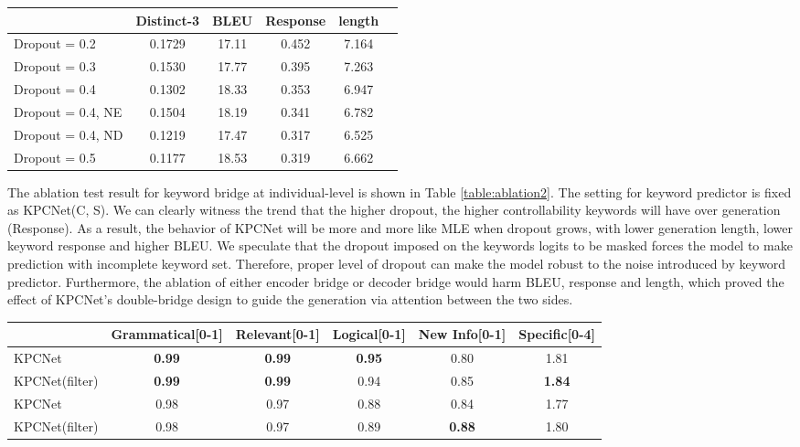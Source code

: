 \documentclass[letterpaper]{article} %
\begin{document}
\begin{table*}[htbp]
  \centering
  \begin{tabular}{l|ccccc}
  \hline
  {} & Distinct-3 & BLEU & Response & length \\
  \hline
  Dropout = 0.2 & 0.1729 & 17.11 & 0.452 & 7.164 \\ 
  Dropout = 0.3 & 0.1530 & 17.77 & 0.395 & 7.263 \\
  Dropout = 0.4 & 0.1302 & 18.33 & 0.353 & 6.947 \\
  Dropout = 0.4, NE & 0.1504 & 18.19 & 0.341 & 6.782 \\
  Dropout = 0.4, ND & 0.1219 & 17.47 & 0.317 & 6.525 \\
  Dropout = 0.5 & 0.1177 & 18.53 & 0.319 & 6.662 \\
  \hline
  \end{tabular}
  \caption{\label{table:ablation2} Ablation test results for keyword bridge at individual-level on \texttt{Home \& Kitchen}.}
  \end{table*}

  The ablation test result for keyword bridge at individual-level is shown in Table \ref{table:ablation2}. The setting for keyword predictor is fixed as KPCNet(C, S). We can clearly witness the trend that the higher dropout, the higher controllability keywords will have over generation (Response). As a result, the behavior of KPCNet will be more and more like MLE when dropout grows, with lower generation length, lower keyword response and higher BLEU. We speculate that the dropout imposed on the keywords logits to be masked forces the model to make prediction with incomplete keyword set. Therefore, proper level of dropout can make the model robust to the noise introduced by keyword predictor. Furthermore, the ablation of either encoder bridge or decoder bridge would harm BLEU, response and length, which proved the effect of KPCNet's double-bridge design to guide the generation via attention between the two sides. 
  

\begin{table*}[htbp]
\centering
\begin{tabular}{l|ccccc}
\hline
{} & Grammatical\tiny{[0-1]} & Relevant\tiny{[0-1]} & Logical\tiny{[0-1]} & New Info\tiny{[0-1]} & Specific\tiny{[0-4]} \\
\hline
KPCNet &        \textbf{0.99} &     \textbf{0.99} &    \textbf{0.95} &     0.80 &     1.81 \\
KPCNet(filter) &        \textbf{0.99} &     \textbf{0.99} &    0.94 &     0.85 &     \textbf{1.84} \\
\hline
KPCNet &        0.98 &     0.97 &    0.88 &     0.84 &     1.77 \\
KPCNet(filter) &        0.98 &     0.97 &    0.89 &     \textbf{0.88} &     1.80 \\
\hline
\end{tabular}
\caption{\label{tab:ind-human-eval-2} Comparison between KPCNet with Dropout=0.3 (upper half) and Dropout=0.2 (lower half) with individual-level human judgements on 100 sample products from \texttt{Home \& Kitchen}}
\end{table*}  
\end{document}
